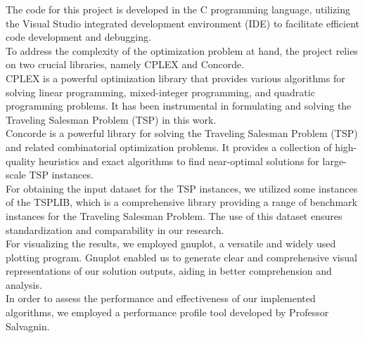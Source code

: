 The code for this project is developed in the C programming language, utilizing the Visual Studio integrated development environment (IDE) to facilitate efficient code development and debugging.
\\To address the complexity of the optimization problem at hand, the project relies on two crucial libraries, namely CPLEX \cite{CPLEX} and Concorde. \\CPLEX is a powerful optimization library that provides various algorithms for solving linear programming, mixed-integer programming, and quadratic programming problems. It has been instrumental in formulating and solving the Traveling Salesman Problem (TSP) in this work.
\\
Concorde is a powerful library for solving the Traveling Salesman Problem (TSP) and related combinatorial optimization problems. It provides a collection of high-quality heuristics and exact algorithms to find near-optimal solutions for large-scale TSP instances. 
\\
For obtaining the input dataset for the TSP instances, we utilized some instances of the TSPLIB, which is a comprehensive library providing a range of benchmark instances for the Traveling Salesman Problem. The use of this dataset ensures standardization and comparability in our research.
\\
For visualizing the results, we employed gnuplot, a versatile and widely used plotting program. Gnuplot enabled us to generate clear and comprehensive visual representations of our solution outputs, aiding in better comprehension and analysis.
\\
In order to assess the performance and effectiveness of our implemented algorithms, we employed a performance profile tool developed by Professor Salvagnin.
